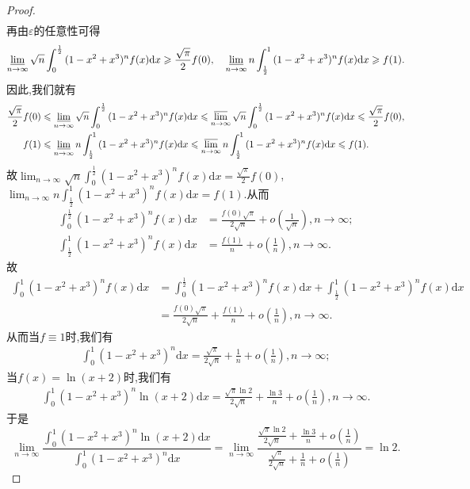 \documentclass[../../main.tex]{subfiles}%
\begin{document}
\begin{proof}
\begin{align*}
\end{align*}
再由\(\varepsilon\)的任意性可得
\begin{align*}
\varliminf_{n\rightarrow\infty}\sqrt{n}\int_0^{\frac{1}{2}}{(1 - x^2 + x^3)^nf(x)\mathrm{d}x}\geqslant \frac{\sqrt{\pi}}{2}f(0),\quad \varliminf_{n\rightarrow\infty}n\int_{\frac{1}{2}}^1{(1 - x^2 + x^3)^nf(x)\mathrm{d}x}\geqslant f(1).
\end{align*}
因此,我们就有
\begin{align*}
\frac{\sqrt{\pi}}{2}f(0)&\leqslant \varliminf_{n\rightarrow\infty}\sqrt{n}\int_0^{\frac{1}{2}}{(1 - x^2 + x^3)^nf(x)\mathrm{d}x}\leqslant \varlimsup_{n\rightarrow\infty}\sqrt{n}\int_0^{\frac{1}{2}}{(1 - x^2 + x^3)^nf(x)\mathrm{d}x}\leqslant \frac{\sqrt{\pi}}{2}f(0),\\
f(1)&\leqslant \varliminf_{n\rightarrow\infty}n\int_{\frac{1}{2}}^1{(1 - x^2 + x^3)^nf(x)\mathrm{d}x}\leqslant \varlimsup_{n\rightarrow\infty}n\int_{\frac{1}{2}}^1{(1 - x^2 + x^3)^nf(x)\mathrm{d}x}\leqslant f(1).
\end{align*}
故\(\lim_{n\rightarrow\infty}\sqrt{n}\int_0^{\frac{1}{2}}{(1 - x^2 + x^3)^nf(x)\mathrm{d}x}=\frac{\sqrt{\pi}}{2}f(0)\),\(\lim_{n\rightarrow\infty}n\int_{\frac{1}{2}}^1{(1 - x^2 + x^3)^nf(x)\mathrm{d}x}=f(1)\).从而
\begin{align*}
\int_0^{\frac{1}{2}}{(1 - x^2 + x^3)^nf(x)\mathrm{d}x}&=\frac{f(0)\sqrt{\pi}}{2\sqrt{n}}+o\left(\frac{1}{\sqrt{n}}\right),  n\rightarrow\infty;\\
\int_{\frac{1}{2}}^1{(1 - x^2 + x^3)^nf(x)\mathrm{d}x}&=\frac{f(1)}{n}+o\left(\frac{1}{n}\right),  n\rightarrow\infty.
\end{align*}
故
\begin{align*}
\int_0^1{(1 - x^2 + x^3)^nf(x)\mathrm{d}x}&=\int_0^{\frac{1}{2}}{(1 - x^2 + x^3)^nf(x)\mathrm{d}x}+\int_{\frac{1}{2}}^1{(1 - x^2 + x^3)^nf(x)\mathrm{d}x}
\\
&=\frac{f(0)\sqrt{\pi}}{2\sqrt{n}}+\frac{f(1)}{n}+o\left(\frac{1}{n}\right),  n\rightarrow\infty.
\end{align*}
从而当\(f\equiv 1\)时,我们有
\begin{align*}
\int_0^1{(1 - x^2 + x^3)^n\mathrm{d}x}=\frac{\sqrt{\pi}}{2\sqrt{n}}+\frac{1}{n}+o\left(\frac{1}{n}\right),  n\rightarrow\infty;
\end{align*}
当\(f(x) = \ln(x + 2)\)时,我们有
\begin{align*}\int_0^1{(1 - x^2 + x^3)^n\ln(x + 2)\mathrm{d}x}=\frac{\sqrt{\pi}\ln 2}{2\sqrt{n}}+\frac{\ln 3}{n}+o\left(\frac{1}{n}\right),  n\rightarrow\infty.
\end{align*}
于是
\[
\lim_{n\rightarrow\infty}\frac{\int_0^1{(1 - x^2 + x^3)^n\ln(x + 2)\mathrm{d}x}}{\int_0^1{(1 - x^2 + x^3)^n\mathrm{d}x}}=\lim_{n\rightarrow\infty}\frac{\frac{\sqrt{\pi}\ln 2}{2\sqrt{n}}+\frac{\ln 3}{n}+o\left(\frac{1}{n}\right)}{\frac{\sqrt{\pi}}{2\sqrt{n}}+\frac{1}{n}+o\left(\frac{1}{n}\right)}=\ln 2.
\]
\end{proof}
\end{document}
